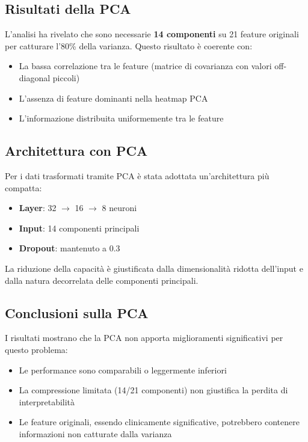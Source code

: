 \subsection{Risultati della PCA}

L'analisi ha rivelato che sono necessarie \textbf{14 componenti} su 21 feature originali per catturare l'80\% della varianza. Questo risultato è coerente con:
\begin{itemize}
    \item La bassa correlazione tra le feature (matrice di covarianza con valori off-diagonal piccoli)
    \item L'assenza di feature dominanti nella heatmap PCA
    \item L'informazione distribuita uniformemente tra le feature
\end{itemize}

\subsection{Architettura con PCA}

Per i dati trasformati tramite PCA è stata adottata un'architettura più compatta:
\begin{itemize}
    \item \textbf{Layer}: 32 $\rightarrow$ 16 $\rightarrow$ 8 neuroni
    \item \textbf{Input}: 14 componenti principali
    \item \textbf{Dropout}: mantenuto a 0.3
\end{itemize}

La riduzione della capacità è giustificata dalla dimensionalità ridotta dell'input e dalla natura decorrelata delle componenti principali.

\subsection{Conclusioni sulla PCA}

I risultati mostrano che la PCA non apporta miglioramenti significativi per questo problema:
\begin{itemize}
    \item Le performance sono comparabili o leggermente inferiori
    \item La compressione limitata (14/21 componenti) non giustifica la perdita di interpretabilità
    \item Le feature originali, essendo clinicamente significative, potrebbero contenere informazioni non catturate dalla varianza
\end{itemize}


